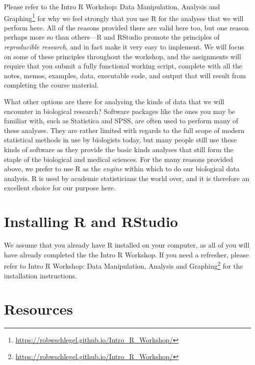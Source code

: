 \documentclass[english,10pt,a4paper,oneside]{book}
\renewcommand{\href}[2]{#2\footnote{\url{#1}}}
\let\rmarkdownfootnote\footnote%
\def\footnote{\protect\rmarkdownfootnote}
\theoremstyle{definition}
\theoremstyle{definition}
\theoremstyle{definition}
\theoremstyle{remark}
\begin{document}
Please refer to the
\href{https://robwschlegel.github.io/Intro_R_Workshop/}{Intro R
Workshop: Data Manipulation, Analysis and Graphing} for why we feel
strongly that you use R \citep{R2017} for the analyses that we will
perform here. All of the reasons provided there are valid here too, but
one reason perhaps more so than others---R and RStudio promote the
principles of \emph{reproducible research}, and in fact make it very
easy to implement. We will focus on some of these principles throughout
the workshop, and the assignments will require that you submit a fully
functional working script, complete with all the notes, memos, examples,
data, executable code, and output that will result from completing the
course material.

What other options are there for analysing the kinds of data that we
will encounter in biological research? Software packages like the ones
you may be familiar with, such as Statistica and SPSS, are often used to
perform many of these analyses. They are rather limited with regards to
the full scope of modern statistical methods in use by biologists today,
but many people still use these kinds of software as they provide the
basic kinds analyses that still form the staple of the biological and
medical sciences. For the many reasons provided above, we prefer to use
R as the \emph{engine} within which to do our biological data analysis.
R is used by academic statisticians the world over, and it is therefore
an excellent choice for our purpose here.

\section{Installing R and RStudio}\label{installing-r-and-rstudio}

We assume that you already have R installed on your computer, as all of
you will have already completed the the Intro R Workshop. If you need a
refresher, please refer to
\href{https://robwschlegel.github.io/Intro_R_Workshop/}{Intro R
Workshop: Data Manipulation, Analysis and Graphing} for the installation
instructions.

\section{Resources}\label{resources}
\end{document}
